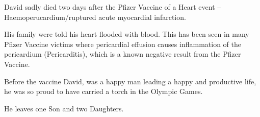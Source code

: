 David sadly died two days after the Pfizer Vaccine of a Heart event –
Haemoperucardium/ruptured acute myocardial infarction.

His family were told his heart flooded with blood. This has been seen in many
Pfizer Vaccine victims where pericardial effusion causes inflammation of the
pericardium (Pericarditis), which is a known negative result from the Pfizer
Vaccine.

Before the vaccine David, was a happy man leading a happy and productive life,
he was so proud to have carried a torch in the Olympic Games.

He leaves one Son and two Daughters.

